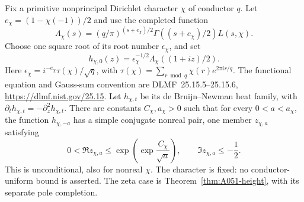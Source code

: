 \begin{corollary}
\label{cor:A051-characterheight}
Fix a primitive nonprincipal Dirichlet character \(\chi\) of conductor
\(q\). Let \(e_\chi=(1-\chi(-1))/2\) and use the completed function
\[
 \Lambda_\chi(s)=
       (q/\pi)^{(s+e_\chi)/2}\Gamma((s+e_\chi)/2)L(s,\chi).
\]
Choose one square root of its root number \(\epsilon_\chi\), and set
\[
 h_{\chi,0}(z)=\epsilon_\chi^{-1/2}
                     \Lambda_\chi((1+iz)/2).
\]
Here \(\epsilon_\chi=i^{-e_\chi}\tau(\chi)/\sqrt q\), with
\(\tau(\chi)=\sum_{r\bmod q}\chi(r)e^{2\pi ir/q}\).
The functional equation and Gauss-sum convention are
DLMF~25.15.5--25.15.6, \url{https://dlmf.nist.gov/25.15}.
Let \(h_{\chi,t}\) be its de Bruijn--Newman heat family, with
\(\partial_t h_{\chi,t}=-\partial_z^2h_{\chi,t}\).
There are constants \(C_\chi,a_\chi>0\) such that for every
\(0<a<a_\chi\), the function \(h_{\chi,-a}\) has a simple conjugate
nonreal pair, one member \(z_{\chi,a}\) satisfying
\[
 0<\Re z_{\chi,a}\le
        \exp\!\left(\exp\frac{C_\chi}{\sqrt a}\right),
          \qquad \Im z_{\chi,a}\le-\frac12.
\]
This is unconditional, also for nonreal \(\chi\). The character is
fixed: no conductor-uniform bound is asserted. The zeta case is
Theorem~\ref{thm:A051-height}, with its separate pole completion.
\end{corollary}

